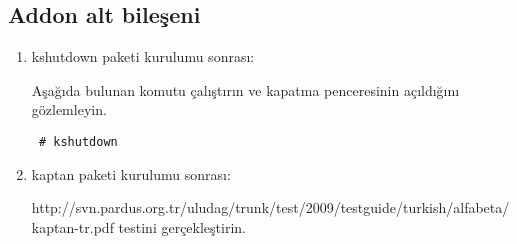 \documentclass[a4paper,10pt]{article}
\begin{document}
\subsection*{Addon alt bileşeni}
\begin{enumerate}
 \item kshutdown paketi kurulumu sonrası:

Aşağıda bulunan komutu çalıştırın ve kapatma penceresinin açıldığını gözlemleyin.
\begin{verbatim}
 # kshutdown 
\end{verbatim}

 \item kaptan paketi kurulumu sonrası:

  http://svn.pardus.org.tr/uludag/trunk/test/2009/testguide/turkish/alfabeta/kaptan-tr.pdf testini gerçekleştirin.

\end{enumerate}
\end{document}
